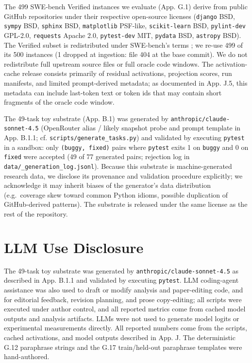 \documentclass[
  11pt,
  a4paper]{article}
\begin{document}
The 499 SWE-bench Verified instances we evaluate (App. G.1) derive from
public GitHub repositories under their respective open-source licenses
(\texttt{django} BSD, \texttt{sympy} BSD, \texttt{sphinx} BSD,
\texttt{matplotlib} PSF-like, \texttt{scikit-learn} BSD,
\texttt{pylint-dev} GPL-2.0, \texttt{requests} Apache 2.0,
\texttt{pytest-dev} MIT, \texttt{pydata} BSD, \texttt{astropy} BSD). The
Verified subset is redistributed under SWE-bench's terms
\citep{jimenez2024swebench}; we re-use 499 of its 500 instances (1
dropped at ingestion: file 404 at the base commit). We do not
redistribute full upstream source files or full oracle code windows. The
activation-cache release consists primarily of residual activations,
projection scores, run manifests, and limited prompt-derived metadata;
as documented in App. J.5, this metadata can include last-token text or
token ids that may contain short fragments of the oracle code window.

The 49-task toy substrate (App. B.1) was generated by
\texttt{anthropic/claude-sonnet-4.5} (OpenRouter alias / likely snapshot
probe and prompt template in App. B.1.1; cf.
\texttt{scripts/generate\_tasks.py}) and validated by executing
\texttt{pytest} in a sandbox: only \texttt{(buggy,\ fixed)} pairs where
\texttt{pytest} exits 1 on \texttt{buggy} and 0 on \texttt{fixed} were
accepted (49 of 77 generated pairs; rejection log in
\texttt{data/\_generation\_log.jsonl}). Because this substrate is
machine-generated research data, we disclose its provenance and
validation procedure explicitly; we acknowledge it may inherit biases of
the generator's data distribution (e.g.~coverage skew toward common
Python idioms, possible duplication of GitHub-derived patterns). The
substrate is released under the same license as the rest of the
repository.

\section{LLM Use Disclosure}\label{llm-use-disclosure}

The 49-task toy substrate was generated by
\texttt{anthropic/claude-sonnet-4.5} as described in App. B.1.1 and
validated by executing \texttt{pytest}. LLM coding-agent assistance was
also used to draft or modify analysis and paper-editing code, and for
editorial feedback, revision planning, and prose copy-editing; all
scripts were executed under author control, and all reported metrics
come from cached model outputs and analysis artifacts. LLMs were not
used to generate model logits or experimental measurements directly. All
reported numbers come from the scripts, cached activations, and model
outputs described in App. J. The deterministic G.12 paraphrase strings
and the G.17 train/held-out paraphrase templates were hand-authored.
\end{document}
